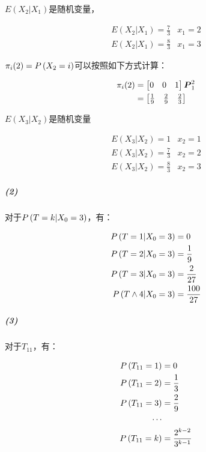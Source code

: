\documentclass{article}
\begin{document}
    $E(X_2|X_1)$是随机变量，

    \begin{eqnarray}
        E(X_2|X_1) = \frac 73 & x_1 = 2 \\
        E(X_2|X_1) = \frac 83 & x_1 = 3 
    \end{eqnarray}

    $\pi_i(2) = P\left(X_2 = i\right)$可以按照如下方式计算：

    \begin{equation}
        \begin{aligned}
            \pi_i(2) &= \begin{bmatrix}
                0 & 0 & 1
            \end{bmatrix}\boldsymbol{P}_1^2 \\
            &= \begin{bmatrix}
                \frac 19 & \frac 29 & \frac 23
            \end{bmatrix}
        \end{aligned}
    \end{equation}

    $E(X_3|X_2)$是随机变量

    \begin{eqnarray}
        E(X_3|X_2) = 1 & x_2 = 1 \\
        E(X_3|X_2) = \frac 73 & x_2 = 2 \\
        E(X_3|X_2) = \frac 83 & x_2 = 3 
    \end{eqnarray}

    \subparagraph*{(2)} 

    对于$P\left(T=k|X_0=3\right)$，有：

    \begin{equation}
        \begin{aligned}
            P\left(T=1|X_0=3\right) &= 0 \\
            P\left(T=2|X_0=3\right) &= \frac 19 \\
            P\left(T=3|X_0=3\right) &= \frac {2}{27} \\
            P\left(T\land 4|X_0 = 3\right) &= \frac {100}{27}
        \end{aligned}
    \end{equation}

    \subparagraph*{(3)} 

    对于$T_{11}$，有：

    \begin{equation}
        \begin{aligned}
            P\left(T_{11}=1\right) &= 0 \\
            P\left(T_{11}=2\right) &= \frac 13 \\
            P\left(T_{11}=3\right) &= \frac 29 \\
            \cdots \\
            P\left(T_{11}=k\right) &= \frac{2^{k-2}}{3^{k-1}}
        \end{aligned}
    \end{equation}
\end{document}
